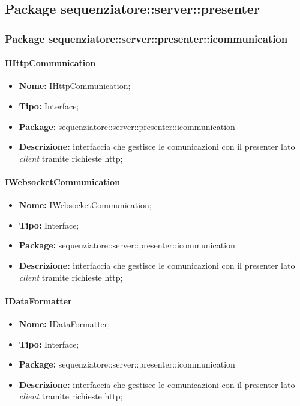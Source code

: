 \subsection{Package sequenziatore::server::presenter}
\subsubsection{Package sequenziatore::server::presenter::icommunication}
\paragraph{IHttpCommunication}
	\begin{itemize}
		\item \textbf{Nome:} IHttpCommunication;
		\item \textbf{Tipo:} Interface;
		\item \textbf{Package:} sequenziatore::server::presenter::icommunication
		\item \textbf{Descrizione:} interfaccia che gestisce le comunicazioni con il presenter lato \textit{client} tramite richieste http;
	\end{itemize}
\paragraph{IWebsocketCommunication}
	\begin{itemize}
		\item \textbf{Nome:} IWebsocketCommunication;
		\item \textbf{Tipo:} Interface;
		\item \textbf{Package:} sequenziatore::server::presenter::icommunication
		\item \textbf{Descrizione:} interfaccia che gestisce le comunicazioni con il presenter lato \textit{client} tramite richieste http;
	\end{itemize}
\paragraph{IDataFormatter}
	\begin{itemize}
		\item \textbf{Nome:} IDataFormatter;
		\item \textbf{Tipo:} Interface;
		\item \textbf{Package:} sequenziatore::server::presenter::icommunication
		\item \textbf{Descrizione:} interfaccia che gestisce le comunicazioni con il presenter lato \textit{client} tramite richieste http;
	\end{itemize}

